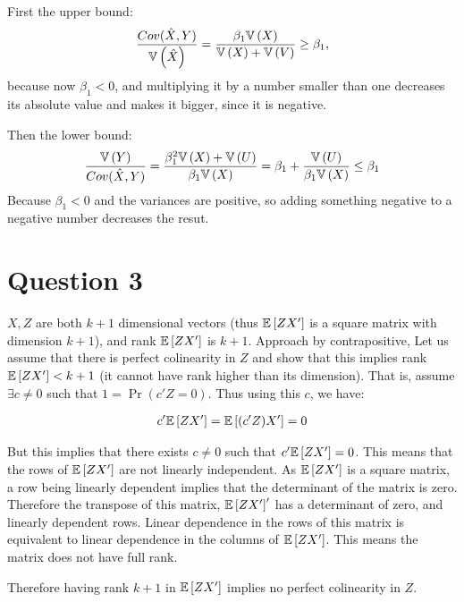 \documentclass[12pt]{paper}
\begin{document}
First the upper bound:
\begin{equation*}
  \frac{Cov( \hat{X}, Y)}{\mathbb{V} \left ( \hat{X} \right )} = \frac{\beta_1 \mathbb{V} \left ( X \right )}{\mathbb{V} \left ( X \right ) + \mathbb{V} \left ( V \right )} \ge \beta_1,
\end{equation*}
because now $\beta_1<0$, and multiplying it by a number smaller than one decreases its absolute value and makes it bigger, since it is negative.

Then the lower bound:
\begin{align*}
  \frac{\mathbb{V} \left ( Y \right )}{Cov( \hat{X}, Y)}=\frac{\beta_1^2 \mathbb{V} \left ( X \right ) + \mathbb{V} \left ( U \right )}{\beta_1 \mathbb{V} \left ( X \right )}=\beta_1+\frac{\mathbb{V} \left ( U \right )}{\beta_1 \mathbb{V} \left ( X \right )}\le \beta_1
\end{align*}
Because $\beta_1<0$ and the variances are positive, so adding something negative to a negative number decreases the resut.


\section*{Question 3}

$X,Z$ are both $k+1$ dimensional vectors (thus $\mathbb{E} \left [ ZX' \right ]$ is a square
matrix with dimension $k+1$), and rank $\mathbb{E} \left [ ZX' \right ]$ is $k+1$. Approach
by contrapositive, Let us assume that there is perfect colinearity in
$Z$ and show that this implies rank $\mathbb{E} \left [ ZX' \right ]< k+1$ (it cannot have
rank higher than its dimension). That is, assume $\exists c \neq 0$ such that
$1 = \Pr ( c' Z = 0)$. Thus using this $c$, we have:

\begin{align*}
  c'\mathbb{E} \left [ ZX' \right ]=\mathbb{E} \left [ (c'Z)X' \right ]=0
\end{align*}

But this implies that there exists $c\ne0$ such that
$c'\mathbb{E} \left [ ZX' \right ]=0$. This means that the rows of $\mathbb{E} \left [ ZX' \right ]$ are not
linearly independent. As $\mathbb{E} \left [ ZX' \right ]$ is a square matrix, a row being
linearly dependent implies that the determinant of the matrix is
zero. Therefore the transpose of this matrix, $\mathbb{E} \left [ ZX' \right ]'$ has a
determinant of zero, and linearly dependent rows. Linear dependence in
the rows of this matrix is equivalent to linear dependence in the
columns of $\mathbb{E} \left [ ZX' \right ]$. This means the matrix does not have full
rank.

Therefore having rank $k+1$ in $\mathbb{E} \left [ ZX' \right ]$ implies no perfect
colinearity in $Z$.
\end{document}
